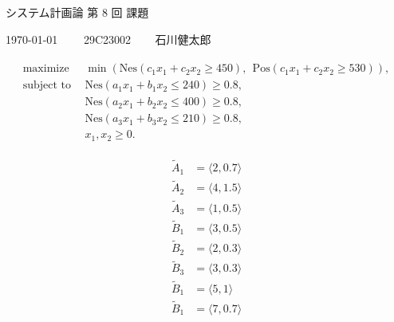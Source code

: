 \documentclass[uplatex, a4j, 11pt, fleqn, dvipdfmx]{article}
\begin{document}
\begin{center}
	{\Huge システム計画論 第 8 回 課題}
\end{center}

\begin{flushright}
	{\Large \today ~~~~ 29C23002 ~~~ 石川健太郎}
\end{flushright}

\begin{align}
	\begin{aligned}
		\text{maximize} ~~   &
		\min \left(
		\mathrm{Nes} \left( c_1 x_1 + c_2 x_2 \geq 450 \right), ~~
		\mathrm{Pos} \left( c_1 x_1 + c_2 x_2 \geq 530 \right)
		\right),
		\\
		\text{subject to} ~~ &
		\mathrm{Nes} \left( a_1 x_1 + b_1 x_2 \leq 240 \right) \geq 0.8,
		\\
		                     & \mathrm{Nes} \left( a_2 x_1 + b_2 x_2 \leq 400 \right) \geq 0.8,
		\\
		                     & \mathrm{Nes} \left( a_3 x_1 + b_3 x_2 \leq 210 \right) \geq 0.8,
		\\
		                     & x_1, x_2 \geq 0.
	\end{aligned}
	\label{fom-1}
\end{align}

\begin{align}
	\tilde{A}_1 & = \langle 2, 0.7 \rangle
	\label{fom-2}                          \\
	\tilde{A}_2 & = \langle 4, 1.5 \rangle
	\label{fom-3}                          \\
	\tilde{A}_3 & = \langle 1, 0.5 \rangle
	\label{fom-4}                          \\
	\tilde{B}_1 & = \langle 3, 0.5 \rangle
	\label{fom-5}                          \\
	\tilde{B}_2 & = \langle 2, 0.3 \rangle
	\label{fom-6}                          \\
	\tilde{B}_3 & = \langle 3, 0.3 \rangle
	\label{fom-7}                          \\
	\tilde{B}_1 & = \langle 5, 1 \rangle
	\label{fom-8}                          \\
	\tilde{B}_1 & = \langle 7, 0.7 \rangle
	\label{fom-9}                          \\
\end{align}
\end{document}
